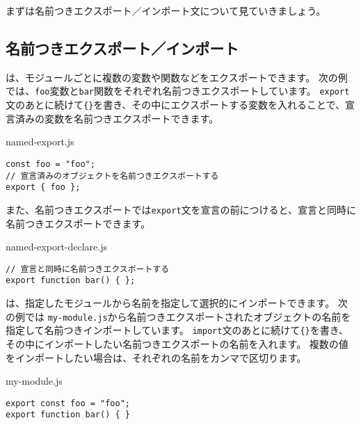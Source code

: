 まずは名前つきエクスポート／インポート文について見ていきましょう。

\hypertarget{named-export-import}{%
\subsection{名前つきエクスポート／インポート}\label{named-export-import}}

\textbf{}は、モジュールごとに複数の変数や関数などをエクスポートできます。
次の例では、\texttt{foo}変数と\texttt{bar}関数をそれぞれ名前つきエクスポートしています。
\texttt{export}文のあとに続けて\texttt{\{\}}を書き、その中にエクスポートする変数を入れることで、宣言済みの変数を名前つきエクスポートできます。

\begin{listtitle}
named-export.js
\end{listtitle}
\begin{lstlisting}
const foo = "foo";
// 宣言済みのオブジェクトを名前つきエクスポートする
export { foo };
\end{lstlisting}
\listend

また、名前つきエクスポートでは\texttt{export}文を宣言の前につけると、宣言と同時に名前つきエクスポートできます。

\begin{listtitle}
named-export-declare.js
\end{listtitle}
\begin{lstlisting}
// 宣言と同時に名前つきエクスポートする
export function bar() { };
\end{lstlisting}
\listend

\textbf{}は、指定したモジュールから名前を指定して選択的にインポートできます。
次の例では
\texttt{my-module.js}から名前つきエクスポートされたオブジェクトの名前を指定して名前つきインポートしています。
\texttt{import}文のあとに続けて\texttt{\{\}}を書き、その中にインポートしたい名前つきエクスポートの名前を入れます。
複数の値をインポートしたい場合は、それぞれの名前をカンマで区切ります。

\begin{listtitle}
my-module.js
\end{listtitle}
\begin{lstlisting}
export const foo = "foo";
export function bar() { }
\end{lstlisting}
\listend

